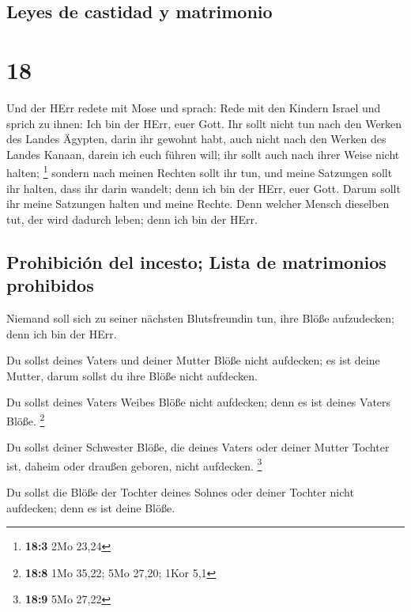 \hypertarget{leyes-de-castidad-y-matrimonio}{%
\subsection{Leyes de castidad y
matrimonio}\label{leyes-de-castidad-y-matrimonio}}

\hypertarget{section-17}{%
\section{18}\label{section-17}}

 Und der HErr redete mit Mose und sprach: 
Rede mit den Kindern Israel und sprich zu ihnen: Ich bin der HErr, euer
Gott.  Ihr sollt nicht tun nach den Werken des Landes
Ägypten, darin ihr gewohnt habt, auch nicht nach den Werken des Landes
Kanaan, darein ich euch führen will; ihr sollt auch nach ihrer Weise
nicht halten; \footnote{\textbf{18:3} 2Mo 23,24}  sondern
nach meinen Rechten sollt ihr tun, und meine Satzungen sollt ihr halten,
dass ihr darin wandelt; denn ich bin der HErr, euer Gott. 
Darum sollt ihr meine Satzungen halten und meine Rechte. Denn welcher
Mensch dieselben tut, der wird dadurch leben; denn ich bin der HErr.

\hypertarget{prohibiciuxf3n-del-incesto-lista-de-matrimonios-prohibidos}{%
\subsection{Prohibición del incesto; Lista de matrimonios
prohibidos}\label{prohibiciuxf3n-del-incesto-lista-de-matrimonios-prohibidos}}

 Niemand soll sich zu seiner nächsten Blutsfreundin tun,
ihre Blöße aufzudecken; denn ich bin der HErr.

 Du sollst deines Vaters und deiner Mutter Blöße nicht
aufdecken; es ist deine Mutter, darum sollst du ihre Blöße nicht
aufdecken.

 Du sollst deines Vaters Weibes Blöße nicht aufdecken;
denn es ist deines Vaters Blöße. \footnote{\textbf{18:8} 1Mo 35,22; 5Mo
  27,20; 1Kor 5,1}

 Du sollst deiner Schwester Blöße, die deines Vaters oder
deiner Mutter Tochter ist, daheim oder draußen geboren, nicht aufdecken.
\footnote{\textbf{18:9} 5Mo 27,22}

 Du sollst die Blöße der Tochter deines Sohnes oder
deiner Tochter nicht aufdecken; denn es ist deine Blöße.

